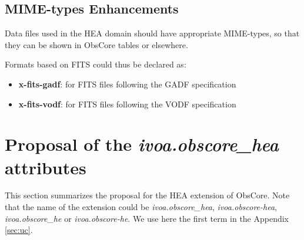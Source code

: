 \documentclass[11pt,a4paper]{ivoa}
\begin{document}
\subsection{MIME-types Enhancements}\label{sec:mimetypes}

Data files used in the \gls{HEA} domain should have appropriate MIME-types, so that they can be shown in ObsCore tables or elsewhere.

Formats based on FITS could thus be declared as:

\begin{itemize}
\item {\bf x-fits-gadf}: for FITS files following the GADF specification \citep{deil_2022_7304668}
\item {\bf x-fits-vodf}: for FITS files following the VODF specification \citep{2023arXiv230813385K}
\end{itemize}

\section{Proposal of the {\it ivoa.obscore\_hea} attributes}\label{sec:ibscoreext}

This section summarizes the proposal for the \gls{HEA} extension of ObsCore. Note that the name of the extension could be {\it ivoa.obscore\_hea}, {\it ivoa.obscore-hea}, {\it ivoa.obscore\_he} or {\it ivoa.obscore-he}. We use here the first term in the Appendix \ref{sec:uc}.
\end{document}
